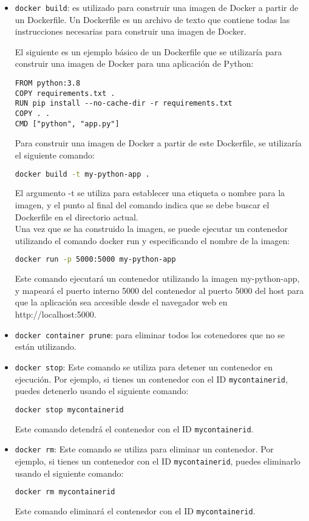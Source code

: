 \documentclass{article}
\begin{document}
\begin{itemize}
\item \lstinline{docker build}: es utilizado para construir una imagen de Docker a partir de un Dockerfile. Un Dockerfile es un archivo de texto que contiene todas las instrucciones necesarias para construir una imagen de Docker.

El siguiente es un ejemplo básico de un Dockerfile que se utilizaría para construir una imagen de Docker para una aplicación de Python:
\begin{lstlisting}[numbers=none]
FROM python:3.8
COPY requirements.txt .
RUN pip install --no-cache-dir -r requirements.txt
COPY . .
CMD ["python", "app.py"]\end{lstlisting}
      Para construir una imagen de Docker a partir de este Dockerfile, se utilizaría el siguiente comando:
\begin{lstlisting}[language=bash]
docker build -t my-python-app .\end{lstlisting}
      El argumento -t se utiliza para establecer una etiqueta o nombre para la imagen, y el punto al final del comando indica que se debe buscar el Dockerfile en el directorio actual.\\
      Una vez que se ha construido la imagen, se puede ejecutar un contenedor utilizando el comando docker run y especificando el nombre de la imagen:
\begin{lstlisting}[language=bash]
docker run -p 5000:5000 my-python-app\end{lstlisting}
            Este comando ejecutará un contenedor utilizando la imagen my-python-app, y mapeará el puerto interno 5000 del contenedor al puerto 5000 del host para que la aplicación sea accesible desde el navegador web en http://localhost:5000.

\item \lstinline{docker container prune}: para eliminar todos los cotenedores que no se están utilizando.


\item \lstinline{docker stop}: Este comando se utiliza para detener un contenedor en ejecución. Por ejemplo, si tienes un contenedor con el ID \lstinline{mycontainerid}, puedes detenerlo usando el siguiente comando:
\begin{lstlisting}[language=bash] 
docker stop mycontainerid\end{lstlisting}
Este comando detendrá el contenedor con el ID \lstinline{mycontainerid}.

    \item \lstinline{docker rm}: Este comando se utiliza para eliminar un contenedor. Por ejemplo, si tienes un contenedor con el ID \lstinline{mycontainerid}, puedes eliminarlo usando el siguiente comando:
\begin{lstlisting}[language=bash]
docker rm mycontainerid\end{lstlisting}
          Este comando eliminará el contenedor con el ID \lstinline{mycontainerid}.


\end{itemize}
\end{document}
